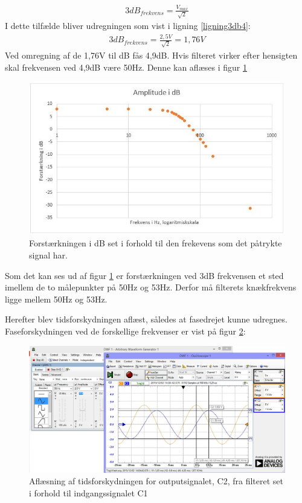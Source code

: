 \begin{align}
3dB_{frekvens}=\frac{V_{max}}{\sqrt{2}}
\label{ligning3db}
\end{align}
I dette tilfælde bliver udregningen som vist i ligning \ref{ligning3db4}:\\
\begin{align}
	3dB_{frekvens}=\frac{2,5V}{\sqrt{2}}=1,76V
	\label{ligning3db4}
\end{align}
Ved omregning af de 1,76V til dB fås 4,9dB. Hvis filteret virker efter hensigten skal frekvensen ved 4,9dB være 50Hz. Denne kan aflæses i figur \ref{fig:AmplitudedBFilter}

\begin{figure}[H]
	\centering
	\includegraphics[width=1\textwidth]{Figurer/Hardware/AmpdBFilter}
	\caption{Forstærkningen i dB set i forhold til den frekevens som det påtrykte signal har.}
	\label{fig:AmplitudedBFilter}
\end{figure}

Som det kan ses ud af figur \ref{fig:AmplitudedBFilter} er forstærkningen ved 3dB frekvensen et sted imellem de to målepunkter på 50Hz og 53Hz. Derfor må filterets knækfrekvens ligge mellem 50Hz og 53Hz.

Herefter blev tidsforskydningen aflæst, således at fasedrejet kunne udregnes. Faseforskydningen ved de forskellige frekvenser er vist på figur \ref{fig:FilterTidsforskydning}:

\begin{figure}[H]
	\centering
	\includegraphics[width=1\textwidth]{Figurer/Hardware/AnalogScreenFilter}
	\caption{Aflæsning af tidsforskydningen for outputsignalet, C2, fra filteret set i forhold til indgangssignalet C1}
	\label{fig:FilterTidsforskydning}
\end{figure}

